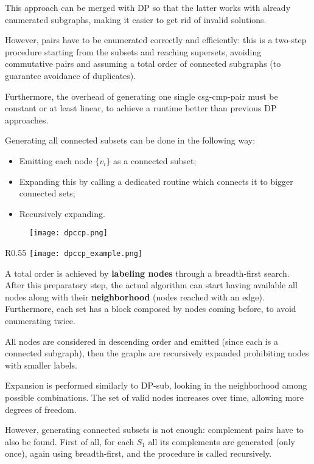 This approach can be merged with DP so that the latter works with already enumerated subgraphs, making it easier to get rid of invalid solutions.

However, pairs have to be enumerated correctly and efficiently: this is a two-step procedure starting from the subsets and reaching supersets, avoiding commutative pairs and assuming a total order of connected subgraphs (to guarantee avoidance of duplicates).

Furthermore, the overhead of generating one single csg-cmp-pair must be constant or at least linear, to achieve a runtime better than previous DP approaches.

Generating all connected subsets can be done in the following way:
\begin{itemize}
	\item Emitting each node $\{v_i\}$ as a connected subset;
	\item Expanding this by calling a dedicated routine which connects it to bigger connected sets;
	\item Recursively expanding.
\end{itemize}

\begin{figure}[h]
	\texttt{[image: dpccp.png]}
	\centering
\end{figure}

\begin{wrapfigure}{R}{0.55\textwidth}
	\vspace{-10pt}
	\texttt{[image: dpccp\_example.png]}
	\vspace{-40pt}
\end{wrapfigure}

A total order is achieved by \textbf{labeling nodes} through a breadth-first search. After this preparatory step, the actual algorithm can start having available all nodes along with their \textbf{neighborhood} (nodes reached with an edge). Furthermore, each set has a block composed by nodes coming before, to avoid enumerating twice.

All nodes are considered in descending order and emitted (since each is a connected subgraph), then the graphs are recursively expanded prohibiting nodes with smaller labels. 

Expansion is performed similarly to DP-sub, looking in the neighborhood among possible combinations. The set of valid nodes increases over time, allowing more degrees of freedom.

However, generating connected subsets is not enough: complement pairs have to also be found. First of all, for each $S_1$ all its complements are generated (only once), again using breadth-first, and the procedure is called recursively.

